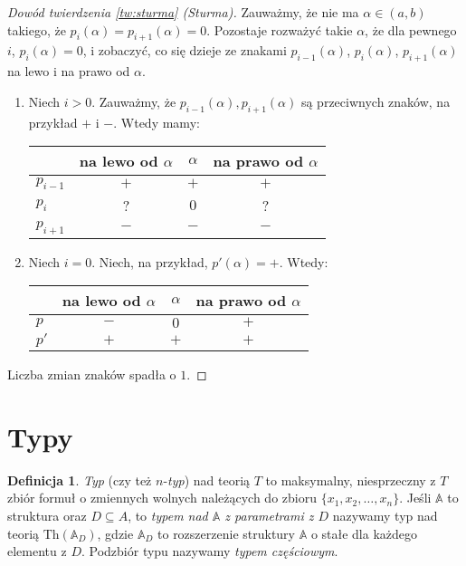 \documentclass{article}
\newcommand{\A}{\mathbb{A}}
\theoremstyle{plain}
\theoremstyle{definition}
\newtheorem{df}[thm]{Definicja}
\theoremstyle{remark}
\newcommand{\Th}{\text{Th}}
\begin{document}
\begin{proof}[Dowód twierdzenia \ref{tw:sturma} (Sturma)]
	Zauważmy, że nie ma $\alpha \in (a, b)$ takiego, że
	$p_i(\alpha) = p_{i+1}(\alpha) = 0$. Pozostaje rozważyć takie $\alpha$,
	że dla pewnego $i$, $p_i(\alpha) = 0$, i zobaczyć, co się dzieje ze
	znakami $p_{i-1}(\alpha)$, $p_{i}(\alpha)$, $p_{i+1}(\alpha)$ na lewo
	i na prawo od $\alpha$.
	\begin{enumerate}
		\item Niech $i > 0$. Zauważmy, że
			$p_{i-1}(\alpha) , p_{i+1}(\alpha)$ są przeciwnych
			znaków, na przykład $+$ i $-$. Wtedy mamy:
			\begin{table}[!htbp] \centering
			\begin{tabular}{l|ccc}
			&na lewo od $\alpha$ & $\alpha$ & na prawo od $\alpha$ \\
				\hline
			$p_{i-1}$ & $+$ & $+$ & $+$ \\
			$p_{i}$ & ? & $0$ & ? \\
			$p_{i+1}$ & $-$ & $-$ & $-$
			\end{tabular}
			\end{table}
		\item Niech $i = 0$. Niech, na przykład, $p'(\alpha) = +$. Wtedy:
			\begin{table}[!htbp] \centering
			\begin{tabular}{l|ccc}
			&na lewo od $\alpha$ & $\alpha$ &na prawo od $\alpha$ \\
				\hline
			$p$ & $-$ & $0$ & $+$ \\
			$p'$ & $+$ & $+$ & $+$
			\end{tabular}
			\end{table}
	\end{enumerate}
	Liczba zmian znaków spadła o $1$.
\end{proof}

\section{Typy}

\begin{df}
	\textit{Typ} (czy też $n$-\textit{typ}) nad teorią $T$ to maksymalny,
	niesprzeczny z $T$ zbiór formuł o zmiennych wolnych należących do
	zbioru $\{x_1, x_2, \ldots, x_n\}$.
	Jeśli $\A$ to struktura oraz $D \subseteq A$, to \textit{typem nad $\A$
	z parametrami z $D$} nazywamy typ nad teorią $\Th(\A_D)$, gdzie $\A_D$
	to rozszerzenie struktury $\A$ o stałe dla każdego elementu z $D$.
	Podzbiór typu nazywamy \textit{typem częściowym}.
\end{df}
\end{document}
